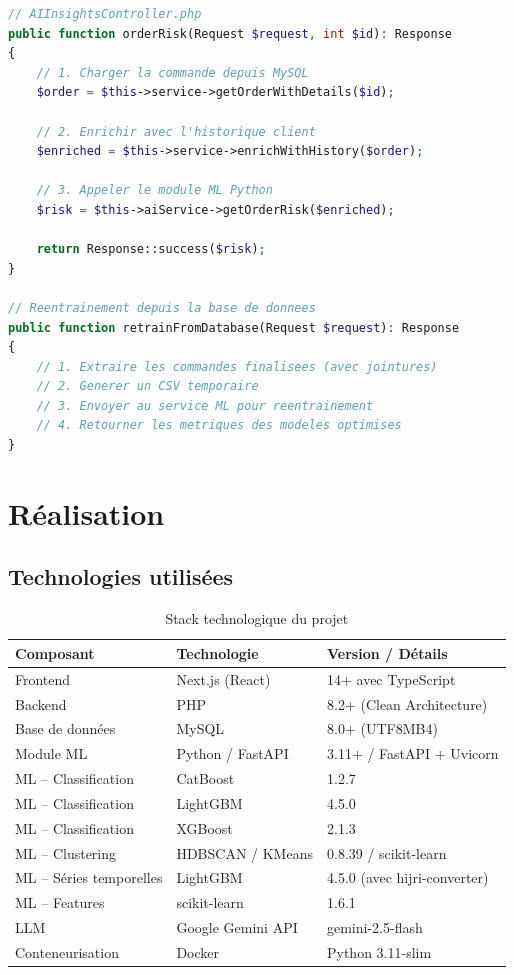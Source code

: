 \documentclass[12pt,a4paper]{report}
\begin{document}
\begin{lstlisting}[language=PHP, caption={Extrait du contr\^{o}leur PHP pour l'IA}]
// AIInsightsController.php
public function orderRisk(Request $request, int $id): Response
{
    // 1. Charger la commande depuis MySQL
    $order = $this->service->getOrderWithDetails($id);

    // 2. Enrichir avec l'historique client
    $enriched = $this->service->enrichWithHistory($order);

    // 3. Appeler le module ML Python
    $risk = $this->aiService->getOrderRisk($enriched);

    return Response::success($risk);
}

// Reentrainement depuis la base de donnees
public function retrainFromDatabase(Request $request): Response
{
    // 1. Extraire les commandes finalisees (avec jointures)
    // 2. Generer un CSV temporaire
    // 3. Envoyer au service ML pour reentrainement
    // 4. Retourner les metriques des modeles optimises
}
\end{lstlisting}


\chapter{R\'{e}alisation}

\section{Technologies utilis\'{e}es}

\begin{table}[H]
\centering
\caption{Stack technologique du projet}
\label{tab:stack}
\begin{tabularx}{\textwidth}{l l X}
\toprule
\textbf{Composant} & \textbf{Technologie} & \textbf{Version / D\'{e}tails} \\
\midrule
Frontend & Next.js (React) & 14+ avec TypeScript \\
Backend & PHP & 8.2+ (Clean Architecture) \\
Base de donn\'{e}es & MySQL & 8.0+ (UTF8MB4) \\
Module ML & Python / FastAPI & 3.11+ / FastAPI + Uvicorn \\
ML -- Classification & CatBoost & 1.2.7 \\
ML -- Classification & LightGBM & 4.5.0 \\
ML -- Classification & XGBoost & 2.1.3 \\
ML -- Clustering & HDBSCAN / KMeans & 0.8.39 / scikit-learn \\
ML -- S\'{e}ries temporelles & LightGBM & 4.5.0 (avec hijri-converter) \\
ML -- Features & scikit-learn & 1.6.1 \\
LLM & Google Gemini API & gemini-2.5-flash \\
Conteneurisation & Docker & Python 3.11-slim \\
\bottomrule
\end{tabularx}
\end{table}
\end{document}

